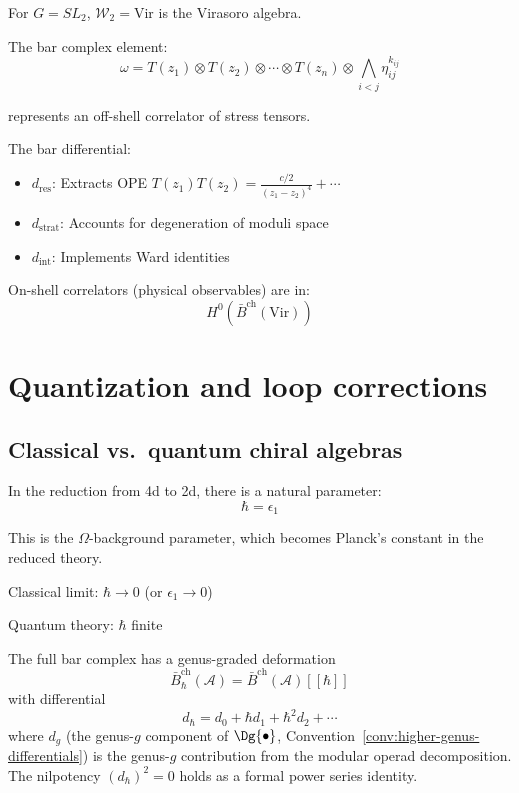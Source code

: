 \begin{example}[Virasoro = \texorpdfstring{$\mathcal{W}_2$}{W_2}]
For $G = SL_2$, $\mathcal{W}_2 = \text{Vir}$ is the Virasoro algebra.

The bar complex element:
\[\omega = T(z_1) \otimes T(z_2) \otimes \cdots \otimes T(z_n) \otimes 
\bigwedge_{i<j} \eta_{ij}^{k_{ij}}\]

represents an off-shell correlator of stress tensors.

The bar differential:
\begin{itemize}
\item $d_{\text{res}}$: Extracts OPE $T(z_1)T(z_2) = \frac{c/2}{(z_1-z_2)^4} + \cdots$
\item $d_{\text{strat}}$: Accounts for degeneration of moduli space
\item $d_{\text{int}}$: Implements Ward identities
\end{itemize}

On-shell correlators (physical observables) are in:
\[H^0(\bar{B}^{\text{ch}}(\text{Vir}))\]
\end{example}

\section{Quantization and loop corrections}

\subsection{Classical vs.\ quantum chiral algebras}

\begin{definition}
In the reduction from 4d to 2d, there is a natural parameter:
\[\hbar = \epsilon_1\]

This is the $\Omega$-background parameter, which becomes Planck's constant in 
the reduced theory.

Classical limit: $\hbar \to 0$ (or $\epsilon_1 \to 0$)

Quantum theory: $\hbar$ finite
\end{definition}

\begin{theorem}
\label{thm:genus-graded-bar}
The full bar complex has a genus-graded deformation
\[\bar{B}^{\mathrm{ch}}_\hbar(\mathcal{A}) = \bar{B}^{\mathrm{ch}}(\mathcal{A})[[\hbar]]\]
with differential
\[d_\hbar = d_0 + \hbar d_1 + \hbar^2 d_2 + \cdots\]
where $d_g$ (the genus-$g$ component of $\Dg{\bullet}$, Convention~\ref{conv:higher-genus-differentials}) is the genus-$g$ contribution from the modular operad decomposition.
The nilpotency $(d_\hbar)^2 = 0$ holds as a formal power series identity.
\end{theorem}

